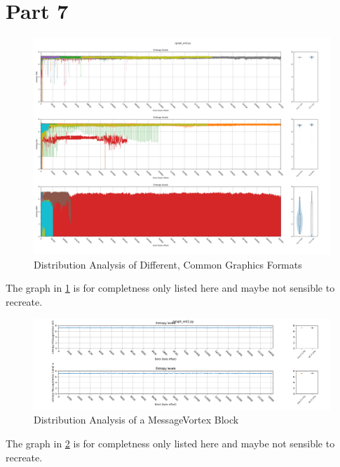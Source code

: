 \documentclass[11pt]{extarticle}
\begin{document}
  	\section{Part 7}
	\begin{figure}[H]
	  	\includegraphics[width=\textwidth]{inc/statanalysis_graph}
	  	\caption{Distribution Analysis of Different, Common Graphics Formats}
	  	\label{fig:statGraph}
	\end{figure}
	The graph in \cref{fig:statGraph} is for completness only listed here and maybe not sensible to recreate.
	  
	\begin{figure}[H]
	  	\includegraphics[width=\textwidth]{inc/statanalysis_mv}
	  	\caption{Distribution Analysis of a MessageVortex Block}
	  	\label{fig:statMvGraph}
	\end{figure}
	The graph in \cref{fig:statMvGraph} is for completness only listed here and maybe not sensible to recreate.
\end{document}
